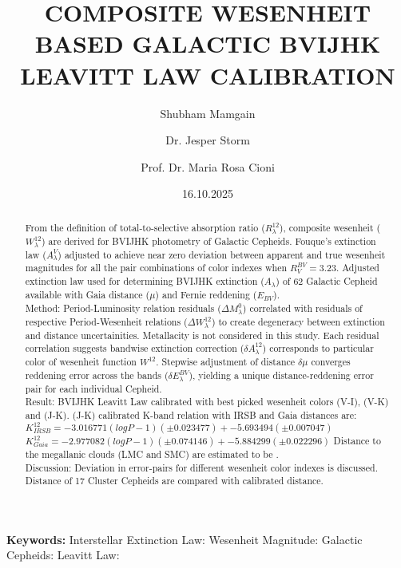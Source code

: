 \documentclass[12pt,a4paper]{article}
\title{COMPOSITE WESENHEIT BASED GALACTIC BVIJHK LEAVITT LAW CALIBRATION}
\author[1]{Shubham Mamgain}
\author[2]{Dr. Jesper Storm}
\author[1,2]{Prof. Dr. Maria Rosa Cioni}
\affil[1]{\small \textit{Institute of Physics and Astronomy, University of Potsdam}}
\affil[2]{\small \textit{Dwarf Galaxy and Galactic Halo, AIP Potsdam}}
\date{16.10.2025}  %
\begin{document}
\maketitle

\begin{abstract}
    From the definition of total-to-selective absorption ratio ($R^{12}_\lambda$), composite wesenheit ($W^{12}_\lambda$) are derived for BVIJHK photometry of Galactic Cepheids. Fouque's extinction law ($A^V_\lambda$) adjusted to achieve near zero deviation between apparent and true wesenheit magnitudes for all the pair combinations of color indexes when $R^{BV}_V = 3.23$. Adjusted extinction law used for determining BVIJHK extinction ($A_\lambda$) of 62 Galactic Cepheid available with Gaia distance ($\mu$) and Fernie reddening ($E_{BV}$). \\

Method: Period-Luminosity relation residuals ($\Delta M^0_\lambda$) correlated with residuals of respective Period-Wesenheit relations ($\Delta W^{12}_\lambda$) to create degeneracy between extinction and distance uncertainities. Metallacity is not considered in this study. Each residual correlation suggests bandwise extinction correction ($\delta A^{12}_\lambda$) corresponds to particular color of wesenheit function $W^12$. Stepwise adjustment of distance $\delta \mu$ converges reddening error across the bands ($\delta E^{BV}_\lambda$), yielding a unique distance-reddening error pair for each individual Cepheid. \\
 
Result: BVIJHK Leavitt Law calibrated with best picked wesenheit colors (V-I), (V-K) and (J-K). 
(J-K) calibrated K-band relation with IRSB and Gaia distances are: 
$K^{12}_{IRSB} = -3.016771 (logP-1) ( \pm 0.023477) + -5.693494 (\pm 0.007047)$    
$K^{12}_{Gaia} = -2.977082 (logP-1) (\pm 0.074146) + -5.884299 (\pm 0.022296)$
Distance to the megallanic clouds (LMC and SMC) are estimated to be .  \\

Discussion: Deviation in error-pairs for different wesenheit color indexes is discussed. Distance of 17 Cluster Cepheids are compared with calibrated distance.
   
\end{abstract}
\textbf{Keywords: } Interstellar Extinction Law: Wesenheit Magnitude: Galactic Cepheids: Leavitt Law: %

\end{document}
